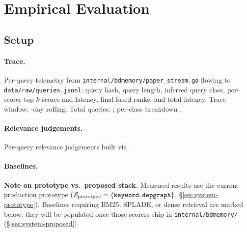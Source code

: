 \section{Empirical Evaluation}
\label{sec:eval}


\subsection{Setup}

\paragraph{Trace.}
Per-query telemetry from \texttt{internal/bdmemory/paper\_stream.go}
flowing to \texttt{data/raw/queries.jsonl}: query hash, query length,
inferred query class, per-scorer top-$k$ scores and latency, final
fused ranks, and total latency. Trace window: -day rolling.
Total queries: ; per-class breakdown
.

\paragraph{Relevance judgements.}
Per-query relevance judgements built via 

\paragraph{Baselines.}

\noindent\textbf{Note on prototype vs.\ proposed stack.}  Measured
results use the current production prototype
($\mathcal{S}_{\text{prototype}} = \{\texttt{keyword}, \texttt{depgraph}\}$,
\S\ref{sec:system-prototype}).  Baselines requiring BM25, SPLADE, or
dense retrieval are marked \tothink{} below; they will be populated
once those scorers ship in \texttt{internal/bdmemory/}
(\S\ref{sec:system-proposed}).

